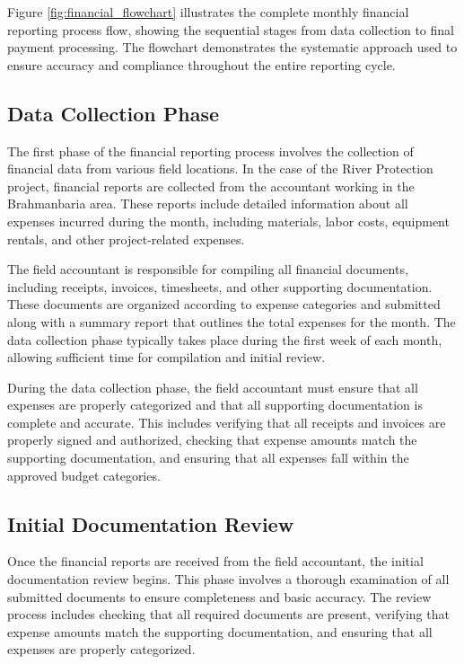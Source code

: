 Figure \ref{fig:financial_flowchart} illustrates the complete monthly financial reporting process flow, showing the sequential stages from data collection to final payment processing. The flowchart demonstrates the systematic approach used to ensure accuracy and compliance throughout the entire reporting cycle.

\subsection{Data Collection Phase}
The first phase of the financial reporting process involves the collection of financial data from various field locations. In the case of the River Protection project, financial reports are collected from the accountant working in the Brahmanbaria area. These reports include detailed information about all expenses incurred during the month, including materials, labor costs, equipment rentals, and other project-related expenses.

The field accountant is responsible for compiling all financial documents, including receipts, invoices, timesheets, and other supporting documentation. These documents are organized according to expense categories and submitted along with a summary report that outlines the total expenses for the month. The data collection phase typically takes place during the first week of each month, allowing sufficient time for compilation and initial review.

During the data collection phase, the field accountant must ensure that all expenses are properly categorized and that all supporting documentation is complete and accurate. This includes verifying that all receipts and invoices are properly signed and authorized, checking that expense amounts match the supporting documentation, and ensuring that all expenses fall within the approved budget categories.

\subsection{Initial Documentation Review}
Once the financial reports are received from the field accountant, the initial documentation review begins. This phase involves a thorough examination of all submitted documents to ensure completeness and basic accuracy. The review process includes checking that all required documents are present, verifying that expense amounts match the supporting documentation, and ensuring that all expenses are properly categorized.


